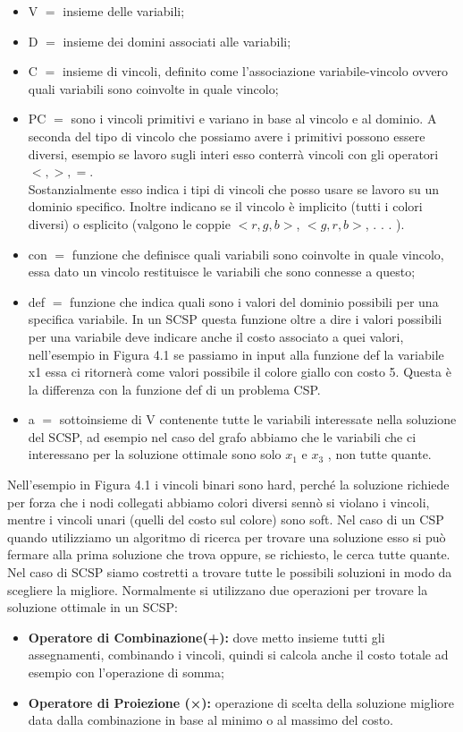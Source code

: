 \begin{itemize}
    \item V $=$ insieme delle variabili;
    \item D $=$ insieme dei domini associati alle variabili;
    \item C $=$ insieme di vincoli, definito come l’associazione variabile-vincolo ovvero quali variabili sono coinvolte in quale vincolo;
    \item PC $=$ sono i vincoli primitivi e variano in base al vincolo e al dominio. A seconda del tipo di vincolo che possiamo avere i primitivi possono essere diversi, esempio se lavoro sugli interi esso conterrà vincoli con gli operatori $<,>,=$.
    \\Sostanzialmente esso indica i tipi di vincoli che posso usare se lavoro su un dominio specifico. Inoltre indicano se il vincolo è implicito (tutti i colori diversi) o esplicito (valgono le coppie $<r,g,b>$, $<g,r,b>$, . . . ).
    \item con $=$ funzione che definisce quali variabili sono coinvolte in quale vincolo, essa dato un vincolo restituisce le variabili che sono connesse a questo;
    \item def $=$ funzione che indica quali sono i valori del dominio possibili per una specifica variabile. In un SCSP questa funzione oltre a dire i valori possibili per una variabile deve indicare anche il costo associato a quei valori, nell’esempio in Figura 4.1 se passiamo in input alla funzione def la variabile x1 essa ci ritornerà come valori possibile il colore giallo con costo 5. Questa è la differenza con la funzione def di un problema CSP.
    \item a $=$ sottoinsieme di V contenente tutte le variabili interessate nella soluzione del SCSP, ad esempio nel caso del grafo abbiamo che le variabili che ci interessano per la soluzione ottimale sono solo $x_1$ e $x_3$ , non tutte quante.
\end{itemize}
Nell’esempio in Figura 4.1 i vincoli binari sono hard, perché la soluzione richiede per forza che i nodi collegati abbiamo colori diversi sennò si violano i vincoli, mentre i vincoli unari (quelli del costo sul colore) sono soft. Nel caso di un CSP quando utilizziamo un algoritmo di ricerca per trovare una soluzione esso si può fermare alla prima soluzione che trova oppure, se richiesto, le cerca tutte quante. Nel caso di SCSP siamo costretti a trovare tutte le possibili soluzioni in modo da scegliere la
migliore. Normalmente si utilizzano due operazioni per trovare la soluzione ottimale in un SCSP:
\begin{itemize}
    \item \textbf{Operatore di Combinazione(+):} dove metto insieme tutti gli assegnamenti, combinando i vincoli, quindi si calcola anche il costo totale ad esempio con l’operazione di somma;
    \item \textbf{Operatore di Proiezione (×):} operazione di scelta della soluzione migliore data dalla combinazione in base al minimo o al massimo del costo.
\end{itemize}


